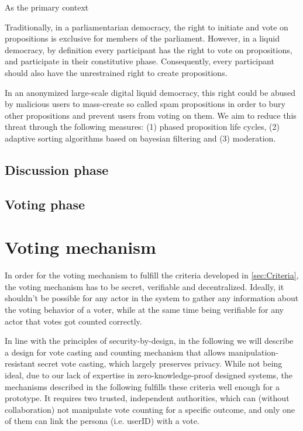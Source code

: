 As the primary context 
	
Traditionally, in a parliamentarian democracy, the right to initiate and vote on propositions is exclusive for members of the parliament.
However, in a liquid democracy, by definition every participant has the right to vote on propositions, and participate in their constitutive phase.
Consequently, every participant should also have the unrestrained right to create propositions.

In an anonymized large-scale digital liquid democracy, this right could be abused by malicious users to mass-create so called spam propositions in order to bury other propositions and prevent users from voting on them.
We aim to reduce this threat through the following measures: (1) phased proposition life cycles, (2) adaptive sorting algorithms based on bayesian filtering and (3) moderation.

\subsection{Discussion phase}
\label{ssec:Lifecycle_Discussion}

\subsection{Voting phase}
\label{ssec:Lifecycle_Voting}

\section{Voting mechanism}
\label{sec:Voting_Mechanism}
In order for the voting mechanism to fulfill the criteria developed in \ref{sec:Criteria}, the voting mechanism has to be secret, verifiable and decentralized. Ideally, it shouldn't be possible for any actor in the system to gather any information about the voting behavior of a voter, while at the same time being verifiable for any actor that votes got counted correctly. 

In line with the principles of security-by-design, in the following we will describe a design for vote casting and counting mechanism that allows manipulation-resistant secret vote casting, which largely preserves privacy. While not being ideal, due to our lack of expertise in zero-knowledge-proof designed systems, the mechanisms described in the following fulfills these criteria well enough for a prototype. It requires two trusted, independent authorities, which can (without collaboration) not manipulate vote counting for a specific outcome, and only one of them can link the persona (i.e. userID) with a vote.

